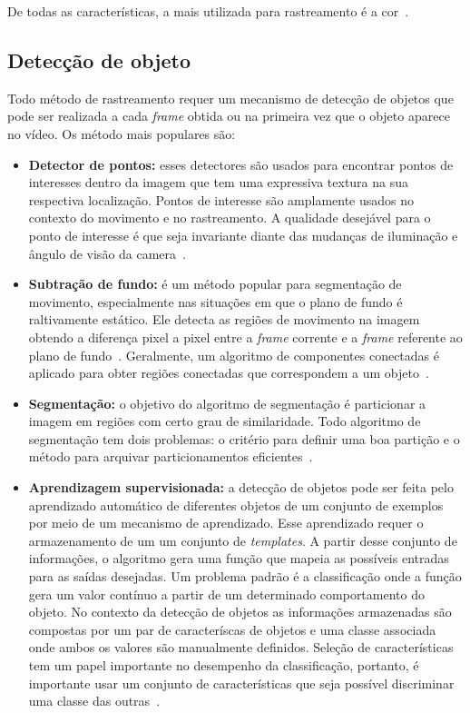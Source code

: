 De todas as características, a mais utilizada para rastreamento é a cor~\cite{yilmaz}.

\subsection{Detecção de objeto}

	Todo método de rastreamento requer um mecanismo de detecção de objetos que pode ser realizada a cada \textit{frame} obtida ou na primeira vez que o objeto aparece no vídeo. Os método mais populares são:


	\begin{itemize}
		\item \textbf{Detector de pontos:} esses detectores são usados para encontrar pontos de interesses dentro da imagem que tem uma expressiva textura na sua respectiva localização. Pontos de interesse são amplamente usados no contexto do movimento e no rastreamento. A qualidade desejável para o ponto de interesse é que seja invariante diante das mudanças de iluminação e ângulo de visão da camera~\cite{yilmaz}.
	
		\item \textbf{Subtração de fundo:} é um método popular para segmentação de movimento, especialmente nas situações em que o plano de fundo é raltivamente estático. Ele detecta as regiões de movimento na imagem obtendo a diferença pixel a pixel entre a \textit{frame} corrente e a \textit{frame} referente ao plano de fundo~\cite{weiming}. Geralmente, um algoritmo de componentes conectadas é aplicado para obter regiões conectadas que correspondem a um objeto~\cite{yilmaz}.

		\item \textbf{Segmentação:} o objetivo do algoritmo de segmentação é particionar a imagem em regiões com certo grau de similaridade. Todo algoritmo de segmentação tem dois problemas: o critério para definir uma boa partição e o método para arquivar particionamentos eficientes~\cite{yilmaz}.

		\item \textbf{Aprendizagem supervisionada:} a detecção de objetos pode ser feita pelo aprendizado automático de diferentes objetos de um conjunto de exemplos por meio de um mecanismo de aprendizado. Esse aprendizado requer o armazenamento de um um conjunto de \textit{templates}. A partir desse conjunto de informações, o algoritmo gera uma função que mapeia as possíveis entradas para as saídas desejadas. Um problema padrão é a classificação onde a função gera um valor contínuo a partir de um determinado comportamento do objeto. No contexto da detecção de objetos as informações armazenadas são compostas por um par de caracteríscas de objetos e uma classe associada onde ambos os valores são manualmente definidos. Seleção de características tem um papel importante no desempenho da classificação, portanto, é importante usar um conjunto de características que seja possível discriminar uma classe das outras~\cite{yilmaz}.
	\end{itemize}



